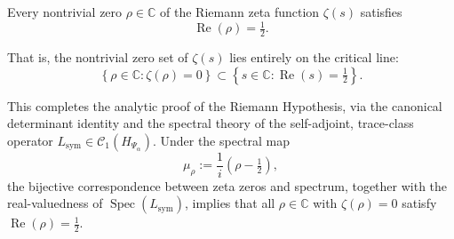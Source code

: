 \begin{theorem}
\label{thm:truth_of_rh}

Every nontrivial zero \( \rho \in \mathbb{C} \) of the Riemann zeta function \( \zeta(s) \) satisfies
\[
\operatorname{Re}(\rho) = \tfrac{1}{2}.
\]

\medskip

\noindent
That is, the nontrivial zero set of \( \zeta(s) \) lies entirely on the critical line:
\[
\left\{ \rho \in \mathbb{C} : \zeta(\rho) = 0 \right\}
\subset \left\{ s \in \mathbb{C} : \operatorname{Re}(s) = \tfrac{1}{2} \right\}.
\]

\medskip

\noindent
This completes the analytic proof of the Riemann Hypothesis, via the canonical determinant identity and the spectral theory of the self-adjoint, trace-class operator \( L_{\mathrm{sym}} \in \mathcal{C}_1(H_{\Psi_\alpha}) \). Under the spectral map
\[
\mu_\rho := \frac{1}{i}(\rho - \tfrac{1}{2}),
\]
the bijective correspondence between zeta zeros and spectrum, together with the real-valuedness of \( \operatorname{Spec}(L_{\mathrm{sym}}) \), implies that all \( \rho \in \mathbb{C} \) with \( \zeta(\rho) = 0 \) satisfy \( \operatorname{Re}(\rho) = \tfrac{1}{2} \).
\end{theorem}
